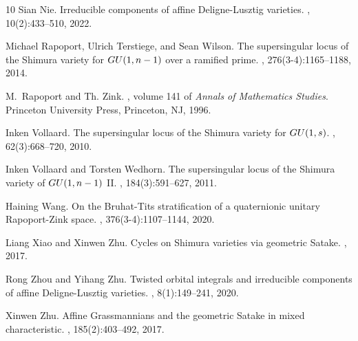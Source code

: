 \documentclass[11pt]{alggeom}
\begin{document}
\begin{thebibliography}{10}
Sian Nie.
\newblock Irreducible components of affine {D}eligne-{L}usztig varieties.
, 10(2):433--510, 2022.


Michael Rapoport, Ulrich Terstiege, and Sean Wilson.
\newblock The supersingular locus of the {S}himura variety for {${\rm
  GU}(1,n-1)$} over a ramified prime.
, 276(3-4):1165--1188, 2014.

M.~Rapoport and Th. Zink.
, volume 141 of {\em
  Annals of Mathematics Studies}.
\newblock Princeton University Press, Princeton, NJ, 1996.



Inken Vollaard.
\newblock The supersingular locus of the {S}himura variety for {${\rm
  GU}(1,s)$}.
, 62(3):668--720, 2010.

Inken Vollaard and Torsten Wedhorn.
\newblock The supersingular locus of the {S}himura variety of {${\rm
  GU}(1,n-1)$} {II}.
, 184(3):591--627, 2011.

Haining Wang.
\newblock On the {B}ruhat-{T}its stratification of a quaternionic unitary
  {R}apoport-{Z}ink space.
, 376(3-4):1107--1144, 2020.

Liang Xiao and Xinwen Zhu.
\newblock Cycles on {S}himura varieties via geometric {S}atake.
, 2017.

Rong Zhou and Yihang Zhu.
\newblock Twisted orbital integrals and irreducible components of affine
  {D}eligne-{L}usztig varieties.
, 8(1):149--241, 2020.

Xinwen Zhu.
\newblock Affine {G}rassmannians and the geometric {S}atake in mixed
  characteristic.
, 185(2):403--492, 2017.

\end{thebibliography}
\end{document}
